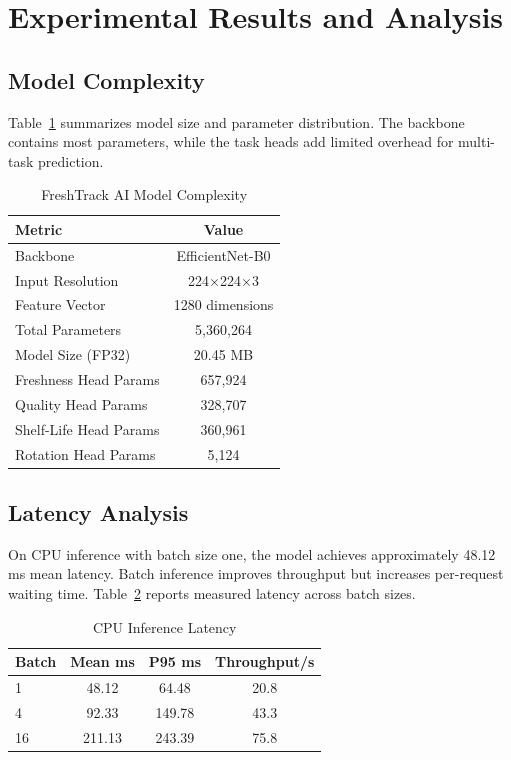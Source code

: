 \documentclass[conference]{IEEEtran}
\begin{document}
\section{Experimental Results and Analysis}
\subsection{Model Complexity}
Table~\ref{tab:model_complexity} summarizes model size and parameter distribution. The backbone contains most parameters, while the task heads add limited overhead for multi-task prediction.

\begin{table}[h]
\centering
\caption{FreshTrack AI Model Complexity}
\label{tab:model_complexity}
\begin{tabular}{lc}
\toprule
\textbf{Metric} & \textbf{Value} \\
\midrule
Backbone & EfficientNet-B0 \\
Input Resolution & 224$\times$224$\times$3 \\
Feature Vector & 1280 dimensions \\
Total Parameters & 5,360,264 \\
Model Size (FP32) & 20.45 MB \\
Freshness Head Params & 657,924 \\
Quality Head Params & 328,707 \\
Shelf-Life Head Params & 360,961 \\
Rotation Head Params & 5,124 \\
\bottomrule
\end{tabular}
\end{table}

\subsection{Latency Analysis}
On CPU inference with batch size one, the model achieves approximately 48.12 ms mean latency. Batch inference improves throughput but increases per-request waiting time. Table~\ref{tab:latency} reports measured latency across batch sizes.

\begin{table}[h]
\centering
\caption{CPU Inference Latency}
\label{tab:latency}
\begin{tabular}{lccc}
\toprule
\textbf{Batch} & \textbf{Mean ms} & \textbf{P95 ms} & \textbf{Throughput/s} \\
\midrule
1 & 48.12 & 64.48 & 20.8 \\
4 & 92.33 & 149.78 & 43.3 \\
16 & 211.13 & 243.39 & 75.8 \\
\bottomrule
\end{tabular}
\end{table}
\end{document}
